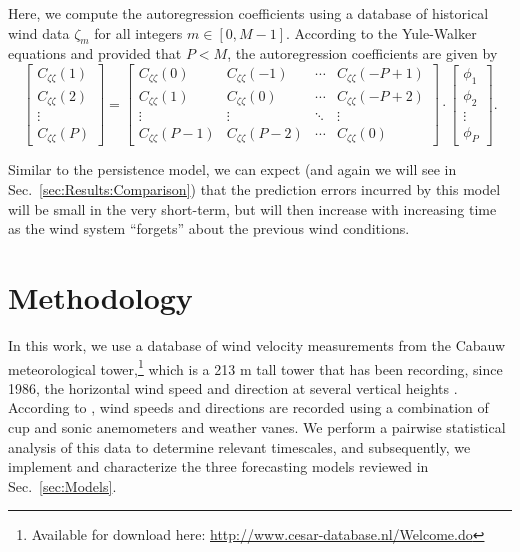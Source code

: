 \documentclass[11pt, oneside]{article}
\newcommand{\secref}[1]{Sec.~\ref{#1}}
\begin{document}
Here, we compute the autoregression coefficients using a database of historical wind data $\zeta_m$ for all integers $m \in [0, M-1]$.
According to the Yule-Walker equations and provided that $P < M$, the autoregression coefficients are given by \citep[Sec.~3.1.1]{Chatfield2000}
\begin{equation}
\begin{bmatrix}
C_{\zeta \zeta}(1) \\
C_{\zeta \zeta}(2) \\
\vdots \\
C_{\zeta \zeta}(P)
\end{bmatrix}
=
\begin{bmatrix}
C_{\zeta \zeta}(0) & C_{\zeta \zeta}(-1) & \cdots & C_{\zeta \zeta} (-P+1) \\
C_{\zeta \zeta}(1) & C_{\zeta \zeta}(0) & \cdots & C_{\zeta \zeta} (-P+2) \\
\vdots & \vdots & \ddots & \vdots \\
C_{\zeta \zeta}(P-1) & C_{\zeta \zeta}(P-2) & \cdots & C_{\zeta \zeta}(0)
\end{bmatrix}
\cdot
\begin{bmatrix}
\phi_1 \\
\phi_2 \\
\vdots \\
\phi_P
\end{bmatrix}.
\end{equation}

Similar to the persistence model, we can expect (and again we will see in \secref{sec:Results:Comparison}) that the prediction errors incurred by this model will be small in the very short-term, but will then increase with increasing time as the wind system ``forgets'' about the previous wind conditions.

\section{Methodology}\label{sec:Methodology}
In this work, we use a database of wind velocity measurements from the Cabauw meteorological tower,\footnote{Available for download here: \url{http://www.cesar-database.nl/Welcome.do}} which is a 213 m tall tower that has been recording, since 1986, the horizontal wind speed and direction at several vertical heights \citep[Table I]{VanUldenWieringa1996}. 
According to \citet[Sec.~2.1]{Petrovic2018}, wind speeds and directions are recorded using a combination of cup and sonic anemometers and weather vanes.
We perform a pairwise statistical analysis of this data to determine relevant timescales, and
subsequently, we implement and characterize the three forecasting models reviewed in \secref{sec:Models}.
\end{document}
